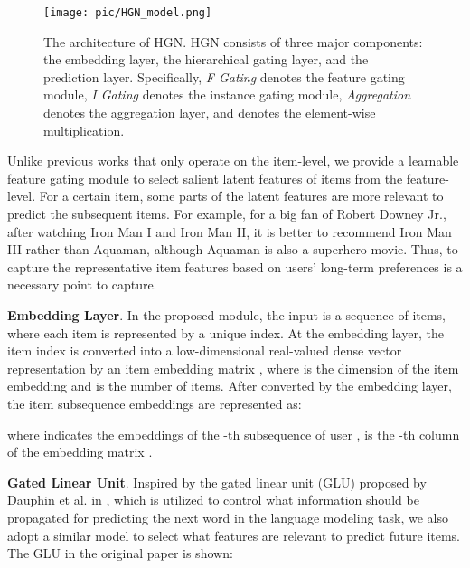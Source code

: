 \documentclass[sigconf]{acmart}
\makeatletter
\def\subsubsection{\@startsection{subsubsection}{3}\z@{.3\linespacing\@plus.7\linespacing}{.1\linespacing}{\normalfont\itshape}}
\makeatother
\begin{document}
\begin{figure*}[t!]
    \centering
    \texttt{[image: pic/HGN\_model.png]}
    \caption{\label{fig:whole_model}The architecture of HGN. HGN consists of three major components: the embedding layer, the hierarchical gating layer, and the prediction layer. Specifically, \textit{F Gating} denotes the feature gating module, \textit{I Gating} denotes the instance gating module, \textit{Aggregation} denotes the aggregation layer, and  denotes the element-wise multiplication.}
\end{figure*}

\subsubsection{Feature Gating}
Unlike previous works \cite{DBLP:conf/wsdm/TangW18,DBLP:conf/cikm/HidasiK18,DBLP:conf/icdm/KangM18} that only operate on the item-level, we provide a learnable feature gating module to select salient latent features of items from the feature-level. For a certain item, some parts of the latent features are more relevant to predict the subsequent items. For example, for a big fan of Robert Downey Jr., after watching Iron Man I and Iron Man II, it is better to recommend Iron Man III rather than Aquaman, although Aquaman is also a superhero movie. Thus, to capture the representative item features based on users' long-term preferences is a necessary point to capture.

\textbf{Embedding Layer}. In the proposed module, the input is a sequence of  items, where each item is represented by a unique index. At the embedding layer, the item index is converted into a low-dimensional real-valued dense vector representation by an item embedding matrix , where  is the dimension of the item embedding and  is the number of items. After converted by the embedding layer, the item subsequence embeddings are represented as:

where  indicates the embeddings of the -th subsequence of user ,  is the -th column of the embedding matrix .

\textbf{Gated Linear Unit}. Inspired by the gated linear unit (GLU) proposed by Dauphin et al. in \cite{DBLP:conf/icml/DauphinFAG17}, which is utilized to control what information should be propagated for predicting the next word in the language modeling task, we also adopt a similar model to select what features are relevant to predict future items. The GLU in the original paper is shown:
 
\end{document}

